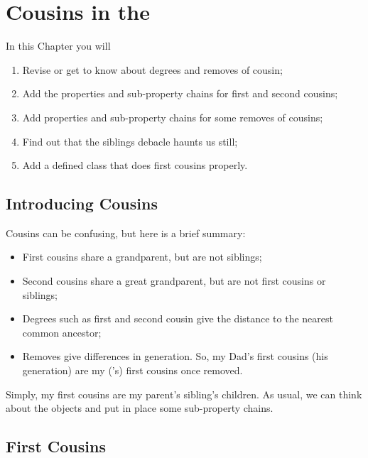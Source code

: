 \chapter{Cousins in the \fhkb}
\label{chap:cousins}
\taskstart 

In this Chapter you will
\begin{enumerate}
\item Revise or get to know about degrees and removes of cousin;
\item Add the properties and sub-property chains for first and second cousins;
\item Add properties and sub-property chains for some removes of cousins;
\item Find out that the siblings debacle haunts us still;
\item Add a defined class that does first cousins properly.
\end{enumerate}



\section{Introducing Cousins}
\label{sec:cousin_intro}

Cousins can be confusing, but here is a brief summary:
\begin{itemize}
\item First cousins share a grandparent, but are not siblings;
\item Second cousins share a great grandparent, but are not first cousins or siblings;
\item Degrees such as first and second cousin give the distance to the nearest common ancestor;
\item Removes give differences in generation. So, my Dad's first cousins (his generation) are my (\rds's) first cousins once removed.
\end{itemize}
Simply, my first cousins are my parent's sibling's children. As usual, we can think about the objects and put in place some sub-property chains.

\section{First Cousins}

